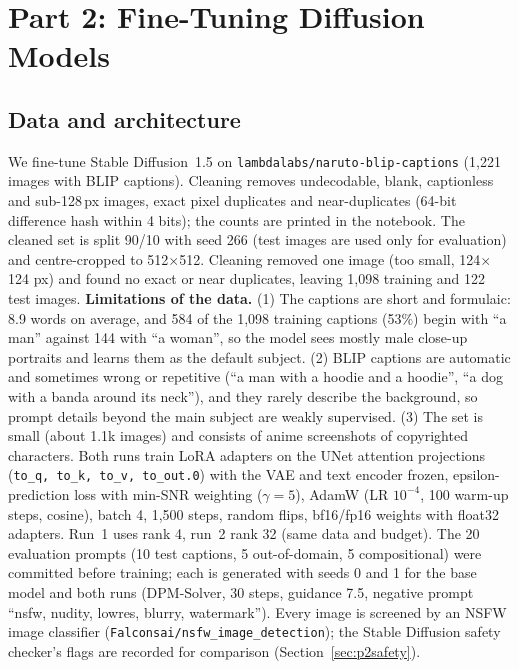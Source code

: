 \documentclass[conference]{IEEEtran}
\begin{document}
\section{Part 2: Fine-Tuning Diffusion Models}

\subsection{Data and architecture}
We fine-tune Stable Diffusion~1.5 on \texttt{lambdalabs/naruto-blip-captions} (1,221 images with BLIP captions).
Cleaning removes undecodable, blank, captionless and sub-128\,px images, exact pixel duplicates and near-duplicates
(64-bit difference hash within 4 bits); the counts are printed in the notebook. The cleaned set is split 90/10 with
seed 266 (test images are used only for evaluation) and centre-cropped to 512$\times$512. Cleaning removed one
image (too small, 124$\times$124 px) and found no exact or near duplicates, leaving 1,098 training and 122 test images.
\textbf{Limitations of the data.} (1) The captions are short and formulaic: 8.9 words on average, and 584 of the 1,098
training captions (53\%) begin with ``a man'' against 144 with ``a woman'', so the model sees mostly male close-up
portraits and learns them as the default subject. (2) BLIP captions are automatic and sometimes wrong or repetitive
(``a man with a hoodie and a hoodie'', ``a dog with a banda around its neck''), and they rarely describe the
background, so prompt details beyond the main subject are weakly supervised. (3) The set is small (about 1.1k images)
and consists of anime screenshots of copyrighted characters.
Both runs train LoRA adapters on the UNet attention projections (\texttt{to\_q, to\_k, to\_v, to\_out.0}) with the
VAE and text encoder frozen, epsilon-prediction loss with min-SNR weighting ($\gamma=5$), AdamW (LR $10^{-4}$, 100
warm-up steps, cosine), batch 4, 1,500 steps, random flips, bf16/fp16 weights with float32 adapters. Run~1 uses rank
4, run~2 rank 32 (same data and budget). The 20 evaluation prompts (10 test captions, 5 out-of-domain, 5
compositional) were committed before training; each is generated with seeds 0 and 1 for the base model and both runs
(DPM-Solver, 30 steps, guidance 7.5, negative prompt ``nsfw, nudity, lowres, blurry, watermark''). Every image is
screened by an NSFW image classifier (\texttt{Falconsai/nsfw\_image\_detection}); the Stable Diffusion safety
checker's flags are recorded for comparison (Section~\ref{sec:p2safety}).
\end{document}
